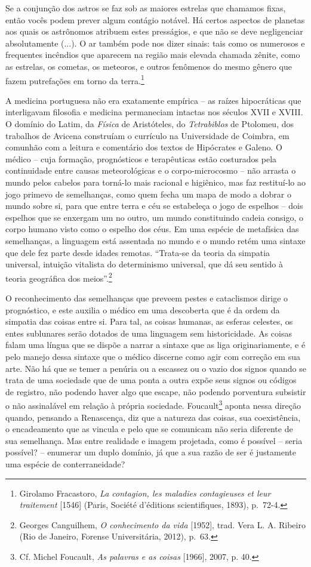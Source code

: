 Se a conjunção dos astros se faz sob as maiores estrelas que chamamos
fixas, então vocês podem prever algum contágio notável. Há certos
aspectos de planetas aos quais os astrônomos atribuem estes presságios,
e que não se deve negligenciar absolutamente (...). O ar também pode nos
dizer sinais: tais como os numerosos e frequentes incêndios que aparecem
na região mais elevada chamada zênite, como as estrelas, os cometas, os
meteoros, e outros fenômenos do mesmo gênero que fazem putrefações em
torno da terra.\footnote{Girolamo Fracastoro, \emph{La contagion, les
  maladies contagieuses et leur traitement} {[}1546{]} (Paris, Société
  d'éditions scientifiques, 1893), p.~72-4.}

A medicina portuguesa não era exatamente empírica -- as raízes
hipocráticas que interligavam filosofia e medicina permaneciam intactas
nos séculos XVII e XVIII. O domínio do Latim, da \emph{Física} de
Aristóteles, do \emph{Tetrabiblos} de Ptolomeu, dos trabalhos de Avicena
construíam o currículo na Universidade de Coimbra, em comunhão com a
leitura e comentário dos textos de Hipócrates e Galeno. O médico -- cuja
formação, prognósticos e terapêuticas estão costurados pela continuidade
entre causas meteorológicas e o corpo-microcosmo -- não arrasta o mundo
pelos cabelos para torná-lo mais racional e higiênico, mas faz
restituí-lo ao jogo primevo de semelhanças, como quem fecha um mapa de
modo a dobrar o mundo sobre si, para que entre terra e céu se estabeleça
o jogo de espelhos -- dois espelhos que se enxergam um no outro, um
mundo constituindo cadeia consigo, o corpo humano visto como o espelho
dos céus. Em uma espécie de metafísica das semelhanças, a linguagem está
assentada no mundo e o mundo retém uma sintaxe que dele fez parte desde
idades remotas. ``Trata-se da teoria da simpatia universal, intuição
vitalista do determinismo universal, que dá seu sentido à teoria
geográfica dos meios''.\footnote{Georges Canguilhem, \emph{O
  conhecimento da vida} {[}1952{]}, trad. Vera L. A. Ribeiro (Rio de
  Janeiro, Forense Universitária, 2012), p.~63.}

O reconhecimento das semelhanças que preveem pestes e cataclismos dirige
o prognóstico, e este auxilia o médico em uma descoberta que é da ordem
da simpatia das coisas entre si. Para tal, as coisas humanas, as esferas
celestes, os entes sublunares serão dotados de uma linguagem sem
historicidade. As coisas falam uma língua que se dispõe a narrar a
sintaxe que as liga originariamente, e é pelo manejo dessa sintaxe que o
médico discerne como agir com correção em sua arte. Não há que se temer
a penúria ou a escassez ou o vazio dos signos quando se trata de uma
sociedade que de uma ponta a outra expõe seus signos ou códigos de
registro, não podendo haver algo que escape, não podendo porventura
subsistir o não assinalável em relação à própria sociedade.
Foucault\footnote{Cf. Michel Foucault, \emph{As palavras e as coisas}
  {[}1966{]}, 2007, p. 40.} aponta nessa direção quando, pensando a
Renascença, diz que a natureza das coisas, sua coexistência, o
encadeamento que as vincula e pelo que se comunicam não seria diferente
de sua semelhança. Mas entre realidade e imagem projetada, como é
possível -- seria possível? -- enumerar um duplo domínio, já que a sua
razão de ser é justamente uma espécie de conterraneidade?

